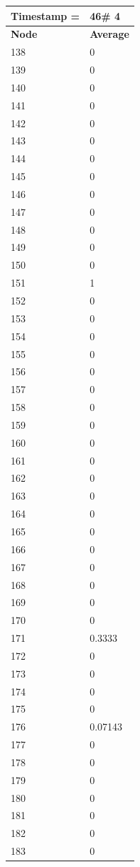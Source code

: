 \begin{tabular}{|l||l|}
\hline
\textbf{Timestamp =} & \textbf{46}\# 4\\\hline
	\textbf{Node} & \textbf{Average} \\ \hline
\hline
	138 & 0 \\ \hline
	139 & 0 \\ \hline
	140 & 0 \\ \hline
	141 & 0 \\ \hline
	142 & 0 \\ \hline
	143 & 0 \\ \hline
	144 & 0 \\ \hline
	145 & 0 \\ \hline
	146 & 0 \\ \hline
	147 & 0 \\ \hline
	148 & 0 \\ \hline
	149 & 0 \\ \hline
	150 & 0 \\ \hline
	151 & 1 \\ \hline
	152 & 0 \\ \hline
	153 & 0 \\ \hline
	154 & 0 \\ \hline
	155 & 0 \\ \hline
	156 & 0 \\ \hline
	157 & 0 \\ \hline
	158 & 0 \\ \hline
	159 & 0 \\ \hline
	160 & 0 \\ \hline
	161 & 0 \\ \hline
	162 & 0 \\ \hline
	163 & 0 \\ \hline
	164 & 0 \\ \hline
	165 & 0 \\ \hline
	166 & 0 \\ \hline
	167 & 0 \\ \hline
	168 & 0 \\ \hline
	169 & 0 \\ \hline
	170 & 0 \\ \hline
	171 & 0.3333 \\ \hline
	172 & 0 \\ \hline
	173 & 0 \\ \hline
	174 & 0 \\ \hline
	175 & 0 \\ \hline
	176 & 0.07143 \\ \hline
	177 & 0 \\ \hline
	178 & 0 \\ \hline
	179 & 0 \\ \hline
	180 & 0 \\ \hline
	181 & 0 \\ \hline
	182 & 0 \\ \hline
	183 & 0 \\ \hline
\end{tabular}
